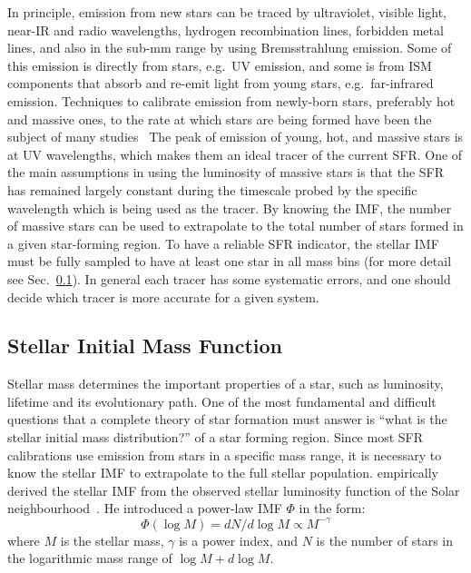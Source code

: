 In principle, emission from new stars can be traced by ultraviolet, visible light, near-IR and radio wavelengths, hydrogen recombination lines, forbidden metal lines, and also in the sub-mm range by using  Bremsstrahlung emission. 
Some of this emission is directly from stars, e.g.\ UV emission, and some is from ISM components that absorb and re-emit light from young stars, e.g.\ far-infrared emission.
Techniques to calibrate emission from newly-born stars, preferably hot and massive ones, to the rate at which stars are being formed have been the subject of many studies~\citep[e.g.][]{Calzetti07, Kennicutt11, Hao11,Bigiel08} 
The peak of emission of young, hot, and massive stars is at UV wavelengths, which makes them an ideal tracer of the current SFR.
One of the main assumptions in using the luminosity of massive stars is that the SFR has remained largely constant during the timescale probed by the specific wavelength which is being used as the tracer. 
By knowing the IMF, the number of massive stars can be used to extrapolate to the total number of stars formed in a given star-forming region.
To have a reliable SFR indicator, the stellar IMF must be fully sampled to have at least one star in all mass bins (for more detail see Sec.~\ref{sec: imf}).
In general each tracer has some systematic errors, and one should decide which tracer is more accurate for a given system. 

\subsection{Stellar Initial Mass Function}
\label{sec: imf}
Stellar mass determines the important properties of a star, such as luminosity, lifetime and its evolutionary path. 
One of the most fundamental and difficult questions that a complete theory of star formation must answer is ``what is the stellar initial mass distribution?'' of a star forming region.
Since most SFR calibrations use emission from stars in a specific mass range, it is necessary to know the stellar IMF to extrapolate to the full stellar population.
\cite{Salpeter55} empirically derived the stellar IMF from the observed stellar luminosity function of the Solar neighbourhood~\citep{Shu87}. 
He introduced a power-law IMF $\Phi$  in the form:
\begin{equation}
\label{equ: salp}
\Phi (\log M) = dN / d \log M \propto M^{-\gamma }
\end{equation} 
where $M$ is the stellar mass, $\gamma$ is a power index, and $N$ is the number of stars in the logarithmic mass range of $\log M + d\log M$.

